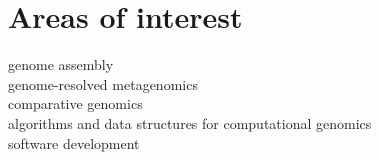\section{Areas of interest}
genome assembly\\
genome-resolved metagenomics\\
comparative genomics\\
algorithms and data structures for computational genomics\\
software development
%
